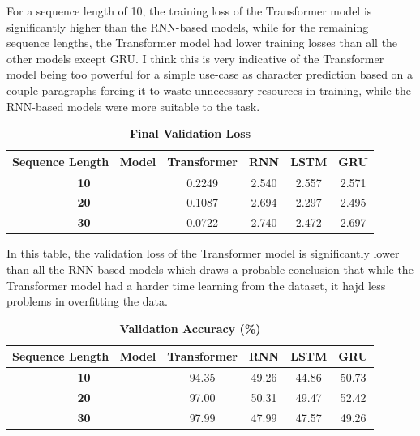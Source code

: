 \documentclass[a4paper]{article}
\begin{document}
For a sequence length of 10, the training loss of the Transformer model is significantly higher than the RNN-based models, while for the remaining sequence lengths, the Transformer model had lower training losses than all the other models except GRU. I think this is very indicative of the Transformer model being too powerful for a simple use-case as character prediction based on a couple paragraphs forcing it to waste unnecessary resources in training, while the RNN-based models were more suitable to the task.

\begin{table}[H]
    \centering
    \caption{\textbf{Final Validation Loss}}
    \label{tab:finalVLp1}
    \begin{tabular}{| c || c | c | c | c |}
        \hline
        Sequence Length \ Model & \textbf{Transformer} & \textbf{RNN} & \textbf{LSTM} & \textbf{GRU} \\
        \hline
        \textbf{10} & 0.2249 & 2.540 & 2.557 & 2.571 \\
        \hline
        \textbf{20} & 0.1087 & 2.694 & 2.297 & 2.495 \\
        \hline
        \textbf{30} & 0.0722 & 2.740 & 2.472 & 2.697 \\
        \hline
    \end{tabular}
\end{table}

In this table, the validation loss of the Transformer model is significantly lower than all the RNN-based models which draws a probable conclusion that while the Transformer model had a harder time learning from the dataset, it hajd less problems in overfitting the data.

\begin{table}[H]
    \centering
    \caption{\textbf{Validation Accuracy (\%)}}
    \label{tab:finalVAp1}
    \begin{tabular}{| c || c | c | c | c |}
        \hline
        Sequence Length \ Model & \textbf{Transformer} & \textbf{RNN} & \textbf{LSTM} & \textbf{GRU} \\
        \hline
        \textbf{10} & 94.35 & 49.26 & 44.86 & 50.73 \\
        \hline
        \textbf{20} & 97.00 & 50.31 & 49.47 & 52.42 \\
        \hline
        \textbf{30} & 97.99 & 47.99 & 47.57 & 49.26 \\
        \hline
    \end{tabular}
\end{table}
\end{document}
